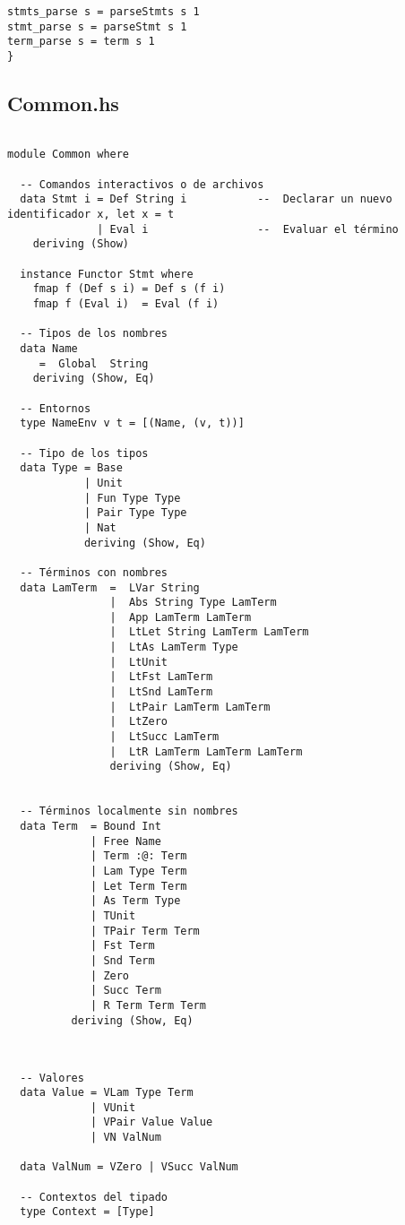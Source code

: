 \documentclass[a4paper]{article}
\begin{document}
\begin{lstlisting}
stmts_parse s = parseStmts s 1
stmt_parse s = parseStmt s 1
term_parse s = term s 1
}

\end{lstlisting}

\pagebreak
\subsection*{Common.hs}
\begin{lstlisting}

module Common where

  -- Comandos interactivos o de archivos
  data Stmt i = Def String i           --  Declarar un nuevo identificador x, let x = t
              | Eval i                 --  Evaluar el término
    deriving (Show)
  
  instance Functor Stmt where
    fmap f (Def s i) = Def s (f i)
    fmap f (Eval i)  = Eval (f i)

  -- Tipos de los nombres
  data Name
     =  Global  String
    deriving (Show, Eq)

  -- Entornos
  type NameEnv v t = [(Name, (v, t))]

  -- Tipo de los tipos
  data Type = Base 
            | Unit
            | Fun Type Type
            | Pair Type Type
            | Nat
            deriving (Show, Eq)
  
  -- Términos con nombres
  data LamTerm  =  LVar String
                |  Abs String Type LamTerm
                |  App LamTerm LamTerm
                |  LtLet String LamTerm LamTerm
                |  LtAs LamTerm Type
                |  LtUnit
                |  LtFst LamTerm
                |  LtSnd LamTerm
                |  LtPair LamTerm LamTerm
                |  LtZero
                |  LtSucc LamTerm
                |  LtR LamTerm LamTerm LamTerm
                deriving (Show, Eq)


  -- Términos localmente sin nombres
  data Term  = Bound Int
             | Free Name 
             | Term :@: Term
             | Lam Type Term
             | Let Term Term
             | As Term Type
             | TUnit
             | TPair Term Term
             | Fst Term
             | Snd Term
             | Zero
             | Succ Term
             | R Term Term Term
          deriving (Show, Eq)


\end{lstlisting}
\pagebreak
\begin{lstlisting}

  -- Valores
  data Value = VLam Type Term 
             | VUnit 
             | VPair Value Value
             | VN ValNum

  data ValNum = VZero | VSucc ValNum

  -- Contextos del tipado
  type Context = [Type]

\end{lstlisting}
\end{document}
